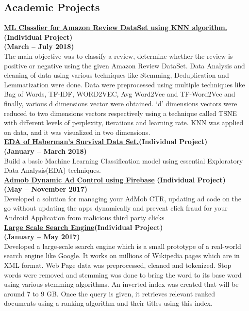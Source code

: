 \documentclass[margin,line]{res}
\begin{document}
\begin{resume}
\section{\sc Academic Projects}

{\bf  \href{https://github.com/sagunesh/Machine-Learning-and-Data-Science/tree/master/KNN\%20on\%20Amazon\%20Review\%20Data\%20Set}{ ML Classfier  for  Amazon Review DataSet using KNN algorithm.}}\hfill {\bf(Individual Project)}\\{\bf(March  --  July 2018)}\\
The main objective was to classify a review, determine whether the review is positive or negative using the given Amazon Review DataSet. Data Analysis and cleaning of data using various techniques like Stemming, Deduplication and Lemmatization were done. Data were preprocessed using multiple techniques like Bag of Words, TF-IDF, WORD2VEC, Avg Word2Vec and TF-Word2Vec and finally, various d dimensions vector were obtained. ‘d’ dimensions vectors were reduced to two dimensions vectors respectively using a technique called TSNE with different levels of perplexity, iterations and learning rate. KNN was applied on data, and it was visualized in two dimensions.\\


{\bf  \href{https://www.kaggle.com/saguneshgrover/habermans-survival-data-set-eda/notebook}{EDA of  Haberman's Survival Data Set.}}\hfill {\bf(Individual Project)}\\{\bf (January -- March 2018)}\\
Build a basic Machine Learning Classification model using essential Exploratory Data Analysis(EDA) techniques.\\

{\bf \href{https://github.com/sagunesh/Admob-Ad-Control} {Admob Dynamic Ad Control using Firebase}} \hfill {\bf(Individual Project)}\\{\bf (May -- November 2017)}\\
Developed a solution for managing your AdMob CTR, updating ad code on the go without updating the apps dynamically and prevent click fraud for your Android Application from malicious third party clicks\\

{\bf  \href{https://github.com/sagunesh/Large-Scale-Search-Engine}{ Large Scale Search Engine}}\hfill{\bf(Individual Project)}\\{\bf (January -- May 2017)}\\
Developed a  large-scale search engine which is a small prototype of a real-world search engine like Google. It works on millions of Wikipedia pages which are in XML format. Web Page data was preprocessed, cleaned and tokenized. Stop words were removed and stemming was done to bring the word to its base word using various stemming algorithms. An inverted index was created that will be around 7 to 9 GB. Once the query is given, it retrieves relevant ranked documents using a ranking algorithm and their titles using this index. \\\\


\end{resume}
\end{document}
